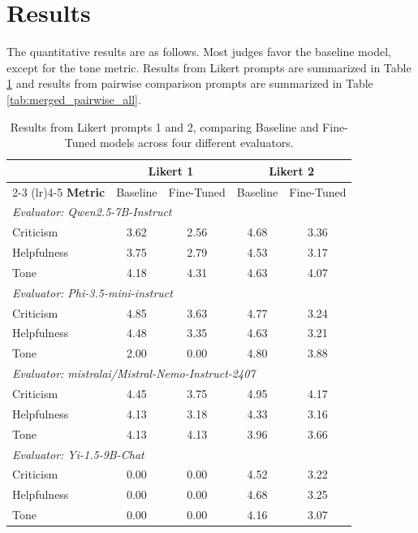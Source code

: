 \documentclass[12pt]{article}
\begin{document}
\section{Results}
The quantitative results are as follows. Most judges favor the baseline model, except for the tone metric. Results from Likert prompts are summarized in Table \ref{tab:merged_evaluators_likert_all} and results from
pairwise comparison prompts are summarized in Table \ref{tab:merged_pairwise_all}.
\begin{table}[htbp]
\centering
\begin{tabular}{lcccc}
\toprule
& \multicolumn{2}{c}{\textbf{Likert 1}} & \multicolumn{2}{c}{\textbf{Likert 2}} \\
\cmidrule(lr){2-3} \cmidrule(lr){4-5}
\textbf{Metric} & Baseline & Fine-Tuned & Baseline & Fine-Tuned \\
\midrule
\multicolumn{5}{l}{\textit{Evaluator: Qwen2.5-7B-Instruct}} \\
\midrule
Criticism   & 3.62 & 2.56 & 4.68 & 3.36 \\
Helpfulness & 3.75 & 2.79 & 4.53 & 3.17 \\
Tone        & 4.18 & 4.31 & 4.63 & 4.07 \\
\midrule
\multicolumn{5}{l}{\textit{Evaluator: Phi-3.5-mini-instruct}} \\
\midrule
Criticism   & 4.85 & 3.63 & 4.77 & 3.24 \\
Helpfulness & 4.48 & 3.35 & 4.63 & 3.21 \\
Tone        & 2.00 & 0.00 & 4.80 & 3.88 \\
\midrule
\multicolumn{5}{l}{\textit{Evaluator: mistralai/Mistral-Nemo-Instruct-2407}} \\
\midrule
Criticism   & 4.45 & 3.75 & 4.95 & 4.17 \\
Helpfulness & 4.13 & 3.18 & 4.33 & 3.16 \\
Tone        & 4.13 & 4.13 & 3.96 & 3.66 \\
\midrule
\multicolumn{5}{l}{\textit{Evaluator: Yi-1.5-9B-Chat}} \\
\midrule
Criticism   & 0.00 & 0.00 & 4.52 & 3.22 \\
Helpfulness & 0.00 & 0.00 & 4.68 & 3.25 \\
Tone        & 0.00 & 0.00 & 4.16 & 3.07 \\
\bottomrule
\end{tabular}
\caption{Results from Likert prompts 1 and 2, comparing Baseline and Fine-Tuned models across four different evaluators.}
\label{tab:merged_evaluators_likert_all}
\end{table}
 
\end{document}
